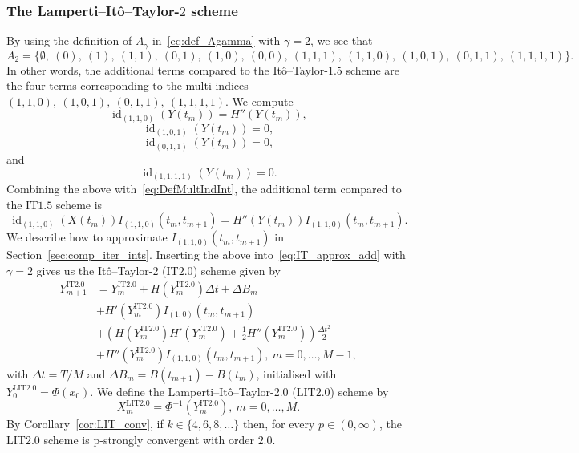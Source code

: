 \documentclass[11pt]{amsart}
\newcommand{\IT}{\textrm{IT}}
\newcommand{\LIT}{\textrm{LIT}}
\newcommand{\id}{\operatorname{id}}
\begin{document}
{\subsubsection{The Lamperti--Itô--Taylor-$2$ scheme}
By using the definition of $A_{\gamma}$ in~\eqref{eq:def_Agamma} with $\gamma=2$, we see that
\begin{equation*}
A_{2} = \{ \emptyset,\ (0),\ (1),\ (1,1),\ (0,1),\ (1,0),\ (0,0),\ (1,1,1),\ (1,1,0),\ (1,0,1),\ (0,1,1),\ (1,1,1,1) \}.
\end{equation*}
In other words, the additional terms compared to the Itô--Taylor-$1.5$ scheme are the four terms corresponding to the multi-indices $(1,1,0),\ (1,0,1),\ (0,1,1),\ (1,1,1,1)$. We compute
\begin{equation*}
\id_{(1,1,0)}(Y(t_{m})) = H''(Y(t_{m})),
\end{equation*}
\begin{equation*}
\id_{(1,0,1)}(Y(t_{m})) = 0,
\end{equation*}
\begin{equation*}
\id_{(0,1,1)}(Y(t_{m})) = 0,
\end{equation*}
and
\begin{equation*}
\id_{(1,1,1,1)}(Y(t_{m})) = 0.
\end{equation*}
Combining the above with~\eqref{eq:DefMultIndInt}, the additional term compared to the $\IT 1.5$ scheme is
\begin{equation*}
\id_{(1,1,0)}(X(t_{m})) I_{(1,1,0)}(t_{m},t_{m+1}) = H''(Y(t_{m})) I_{(1,1,0)}(t_{m},t_{m+1}).
\end{equation*}
We describe how to approximate $I_{(1,1,0)}(t_{m},t_{m+1})$ in Section~\ref{sec:comp_iter_ints}. Inserting the above into~\eqref{eq:IT_approx_add} with $\gamma = 2$ gives us the Itô--Taylor-$2$ ($\IT 2.0$) scheme given by
\begin{align*}
Y^{\IT 2.0}_{m+1} &= Y^{\IT 2.0}_{m} + H(Y^{\IT 2.0}_{m}) \Delta t + \Delta B_{m} \\ &+ H'(Y^{\IT 2.0}_{m}) I_{(1,0)}(t_{m},t_{m+1}) \\ &+ \left( H(Y^{\IT 2.0}_{m}) H'(Y^{\IT 2.0}_{m}) + \frac{1}{2} H''(Y^{\IT 2.0}_{m}) \right) \frac{\Delta t^{2}}{2} \\ &+ H''(Y^{\IT 2.0}_{m}) I_{(1,1,0)}(t_{m},t_{m+1}),\ m=0,\ldots,M-1,
\end{align*}
with $\Delta t = T/M$ and $\Delta B_{m} = B(t_{m+1})-B(t_{m})$, initialised with $Y^{\LIT 2.0}_{0} = \Phi(x_{0})$. We define the Lamperti--Itô--Taylor-$2.0$ ($\LIT 2.0$) scheme by
\begin{equation*}
X^{\LIT 2.0}_{m} = \Phi^{-1}(Y^{\IT 2.0}_{m}),\ m=0,\ldots,M.
\end{equation*}
By Corollary~\ref{cor:LIT_conv}, if $k \in \{4,6,8, \ldots \}$ then, for every $p \in (0,\infty)$, the $\LIT 2.0$ scheme is p-strongly convergent with order $2.0$. 

}
\end{document}
